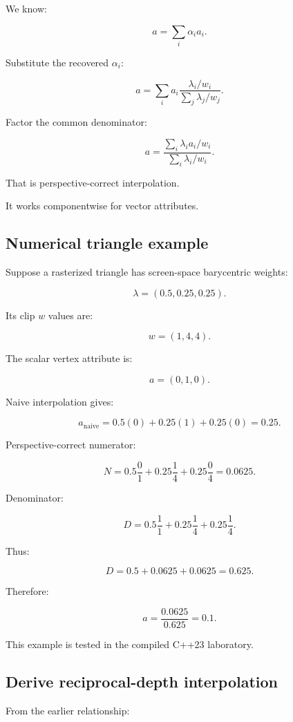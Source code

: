 We know:

\[
 a=\sum_i\alpha_i a_i.
\]

Substitute the recovered \(\alpha_i\):

\[
 a= \sum_i a_i \frac{\lambda_i/w_i} {\sum_j\lambda_j/w_j}.
\]

Factor the common denominator:

\[
 \boxed{ a= \frac{ \sum_i\lambda_i a_i/w_i }{ \sum_i\lambda_i/w_i } }.
\]

That is perspective-correct interpolation.

It works componentwise for vector attributes.

\subsection{Numerical triangle example}\label{02-foundations-ii-ch034-numerical-triangle-example}

Suppose a rasterized triangle has screen-space barycentric weights:

\[
 \lambda=(0.5,0.25,0.25).
\]

Its clip \(w\) values are:

\[
 w=(1,4,4).
\]

The scalar vertex attribute is:

\[
 a=(0,1,0).
\]

Naive interpolation gives:

\[
 a_{\mathrm{naive}} = 0.5(0)+0.25(1)+0.25(0) =\boxed{0.25}.
\]

Perspective-correct numerator:

\[
 N= 0.5\frac01+ 0.25\frac14+ 0.25\frac04 =0.0625.
\]

Denominator:

\[
 D= 0.5\frac11+ 0.25\frac14+ 0.25\frac14.
\]

Thus:

\[
 D=0.5+0.0625+0.0625=0.625.
\]

Therefore:

\[
 \boxed{ a=\frac{0.0625}{0.625}=0.1 }.
\]

This example is tested in the compiled C++23 laboratory.

\subsection{Derive reciprocal-depth interpolation}\label{02-foundations-ii-ch034-derive-reciprocal-depth-interpolation}

From the earlier relationship:

